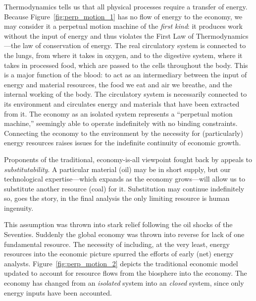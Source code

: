 Thermodynamics tells us that all physical processes require
a transfer of energy.
Because Figure~\ref{fig:perp_motion_1} has no flow of energy
to the economy,
we may consider it a perpetual motion machine
of the \emph{first kind}:
it produces work without the input of energy and
thus violates the First Law of Thermodynamics---the 
law of conservation of energy.\cite{Rao2004}
The real circulatory system is connected to the lungs,
from where it takes in oxygen,
and to the digestive system, 
where it takes in processed food,
which are passed to the cells throughout the body.
This is a major function of the blood:
to act as an intermediary between the input of energy
and material resources,
the food we eat and air we breathe,
and the internal working of the body.
The circulatory system is necessarily connected 
to its environment and circulates energy and materials
that have been extracted from it.
The economy as an isolated system
represents a ``perpetual motion machine,'' %
seemingly able to operate indefinitely with 
no binding constraints.
Connecting the economy to the environment
by the necessity for (particularly) energy
resources raises issues for the indefinite
continuity of economic growth.

Proponents of the traditional, 
economy-is-all viewpoint fought back
by appeals to \emph{substitutability}.
A particular material (oil) may be in short supply,
but our technological expertise---which expands
as the economy grows---will allow us to substitute
another resource (coal) for it.
Substitution may continue indefinitely so,
goes the story,
in the final analysis the only limiting resource is
human ingenuity.\cite{Simon1981, Simon1998}

This assumption was thrown into stark relief following the oil
shocks of the Seventies.
Suddenly the global economy was thrown
into reverse for lack of one fundamental resource.
The necessity of including,
at the very least,
energy resources into the economic picture
spurred the efforts of early (net) energy 
analysts.\cite{Gilliland1975, Chapman1976}
Figure~\ref{fig:perp_motion_2} depicts the traditional
economic model updated to account for 
resource flows from the biosphere
into the economy.
The economy has changed from an \emph{isolated}
system into an \emph{closed} system,
since only energy inputs have been accounted.

